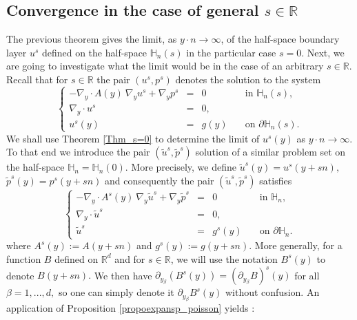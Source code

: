 \documentclass[11pt, reqno]{amsart}
\theoremstyle{definition}
\theoremstyle{remark}
\numberwithin{equation}{section}
\begin{document}
	\subsection{Convergence in the case of general $s\in\mathbb{R}$}
	\noindent The previous theorem gives the limit, as $y\cdot n \rightarrow \infty$, of the half-space boundary layer $u^s$ defined on the half-space ${\mathbb{H}}_n(s)$ in the particular case $s=0$. Next, we are going to investigate what the limit would be in the case of an arbitrary $s\in\mathbb{R}.$	\noindent Recall that for $s\in\mathbb{R}$ the pair $(u^s,p^s)$ denotes the solution to the system  
	\begin{equation*}
		\left\{
		\begin{array}{rcll}
			-\nabla_y\cdot A(y ) \: \nabla_y u^s +  \nabla_y p^s&=& 0& \mbox{in } {\mathbb{H}}_n(s),\\
			\nabla_y\cdot u^s&=& 0,    &\\
			u^s(y) &=& g(y)  \quad & \mbox{on } \partial{\mathbb{H}}_n(s).
		\end{array}
		\right. 
	\end{equation*}
	We shall use Theorem \ref{Thm_s=0} to determine the limit of $u^s(y)$ as $y\cdot n \rightarrow \infty$. To that end we introduce the pair 	$(\tilde{u}^s,\tilde{p}^s)$ solution of a similar problem set on the half-space $\mathbb{H}_n=\mathbb{H}_n(0)$. More precisely, we define
	$\tilde{u}^s(y)=u^s(y+sn),$ $\tilde{p}^s(y)=p^s(y+sn)$ and consequently the pair 	$(\tilde{u}^s,\tilde{p}^s)$ satisfies
	\begin{equation}\label{hspace_prob_tild}
		\left\{
		\begin{array}{rcll}
			-\nabla_y\cdot A^s(y ) \: \nabla_y \tilde{u}^s +  \nabla_y \tilde{p}^s&=& 0 & \mbox{in } {\mathbb{H}}_n,\\
			\nabla_y\cdot\tilde{u}^s &=& 0  ,    &\\
			\tilde{u}^s &=& g^s(y)  \quad & \mbox{on } \partial{\mathbb{H}}_n.
		\end{array}
		\right. 
	\end{equation}
	where 	 $A^s(y):=A(y+sn)$ and $g^s(y):=g(y+sn).$	\noindent More generally, for a function $B$ defined on $\mathbb{R}^d$ and for $s\in\mathbb{R}$, we will use the notation $B^s(y)$ to denote  $B(y+sn).$ We then have $\partial_{y_\beta} (B^s(y))=(\partial_{y_\beta} B)^s(y)$ for all $\beta=1,...,d,$ so one can simply denote it $\partial_{y_\beta} B^s(y)$ without confusion.
		\noindent 	An application of Proposition \ref{propoexpansp_poisson} yields :
\end{document}
